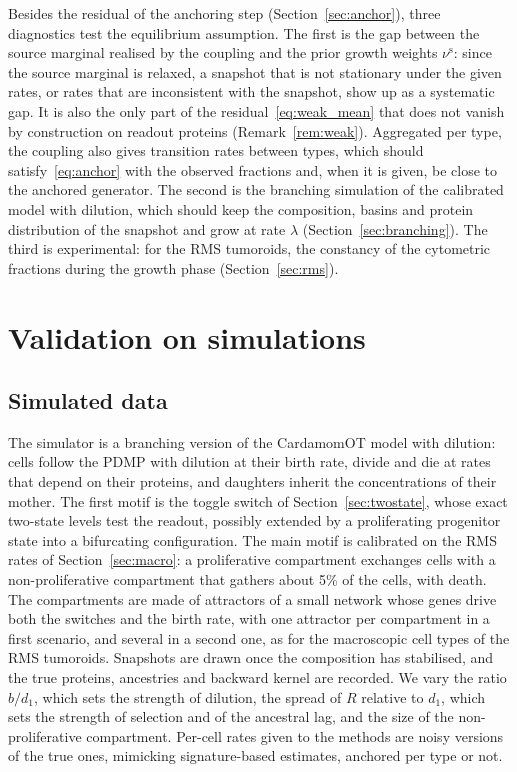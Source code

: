\documentclass[a4paper, 11pt]{article}
\theoremstyle{plain}
\theoremstyle{remark}
\begin{document}
Besides the residual of the anchoring step (Section~\ref{sec:anchor}), three diagnostics test the equilibrium assumption. The first is the gap between the source marginal realised by the coupling and the prior growth weights $\nu^{\mathrm{s}}$: since the source marginal is relaxed, a snapshot that is not stationary under the given rates, or rates that are inconsistent with the snapshot, show up as a systematic gap. It is also the only part of the residual~\eqref{eq:weak_mean} that does not vanish by construction on readout proteins (Remark~\ref{rem:weak}). Aggregated per type, the coupling also gives transition rates between types, which should satisfy~\eqref{eq:anchor} with the observed fractions and, when it is given, be close to the anchored generator. The second is the branching simulation of the calibrated model with dilution, which should keep the composition, basins and protein distribution of the snapshot and grow at rate $\lambda$ (Section~\ref{sec:branching}). The third is experimental: for the RMS tumoroids, the constancy of the cytometric fractions during the growth phase (Section~\ref{sec:rms}).

\section{Validation on simulations}\label{sec:validation}

\subsection{Simulated data}

The simulator is a branching version of the CardamomOT model with dilution: cells follow the PDMP with dilution at their birth rate, divide and die at rates that depend on their proteins, and daughters inherit the concentrations of their mother. The first motif is the toggle switch of Section~\ref{sec:twostate}, whose exact two-state levels test the readout, possibly extended by a proliferating progenitor state into a bifurcating configuration. The main motif is calibrated on the RMS rates of Section~\ref{sec:macro}: a proliferative compartment exchanges cells with a non-proliferative compartment that gathers about 5\% of the cells, with death. The compartments are made of attractors of a small network whose genes drive both the switches and the birth rate, with one attractor per compartment in a first scenario, and several in a second one, as for the macroscopic cell types of the RMS tumoroids. Snapshots are drawn once the composition has stabilised, and the true proteins, ancestries and backward kernel are recorded. We vary the ratio $b/d_1$, which sets the strength of dilution, the spread of $R$ relative to $d_1$, which sets the strength of selection and of the ancestral lag, and the size of the non-proliferative compartment. Per-cell rates given to the methods are noisy versions of the true ones, mimicking signature-based estimates, anchored per type or not.
\end{document}
